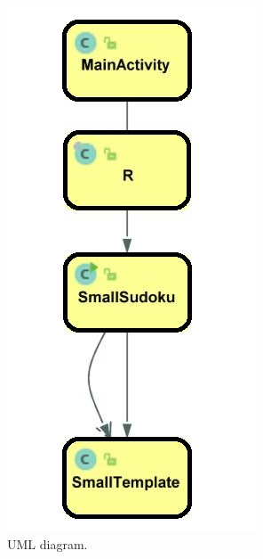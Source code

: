 \documentclass[a4paper,twoside,12pt]{book}
\begin{document}
\begin{figure}[H]
\centering
  \includegraphics[width=\linewidth/2]{UML.jpg}
  \caption{UML diagram.}
  \label{fig:Diagram}
\end{figure}
\end{document}

